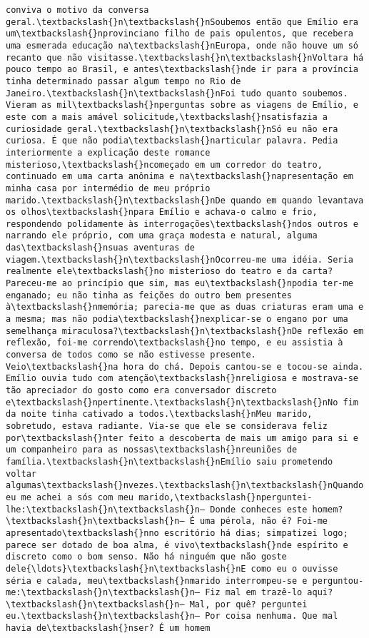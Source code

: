 \documentclass[11pt]{article}
\begin{document}
\begin{Verbatim}[commandchars=\\\{\}]
conviva o motivo da conversa geral.\textbackslash{}n\textbackslash{}nSoubemos então que Emílio era um\textbackslash{}nprovinciano filho de pais opulentos, que recebera uma esmerada educação na\textbackslash{}nEuropa, onde não houve um só recanto que não visitasse.\textbackslash{}n\textbackslash{}nVoltara há pouco tempo ao Brasil, e antes\textbackslash{}nde ir para a província tinha determinado passar algum tempo no Rio de Janeiro.\textbackslash{}n\textbackslash{}nFoi tudo quanto soubemos. Vieram as mil\textbackslash{}nperguntas sobre as viagens de Emílio, e este com a mais amável solicitude,\textbackslash{}nsatisfazia a curiosidade geral.\textbackslash{}n\textbackslash{}nSó eu não era curiosa. É que não podia\textbackslash{}narticular palavra. Pedia interiormente a explicação deste romance misterioso,\textbackslash{}ncomeçado em um corredor do teatro, continuado em uma carta anônima e na\textbackslash{}napresentação em minha casa por intermédio de meu próprio marido.\textbackslash{}n\textbackslash{}nDe quando em quando levantava os olhos\textbackslash{}npara Emílio e achava-o calmo e frio, respondendo polidamente às interrogações\textbackslash{}ndos outros e narrando ele próprio, com uma graça modesta e natural, alguma das\textbackslash{}nsuas aventuras de viagem.\textbackslash{}n\textbackslash{}nOcorreu-me uma idéia. Seria realmente ele\textbackslash{}no misterioso do teatro e da carta? Pareceu-me ao princípio que sim, mas eu\textbackslash{}npodia ter-me enganado; eu não tinha as feições do outro bem presentes à\textbackslash{}nmemória; parecia-me que as duas criaturas eram uma e a mesma; mas não podia\textbackslash{}nexplicar-se o engano por uma semelhança miraculosa?\textbackslash{}n\textbackslash{}nDe reflexão em reflexão, foi-me correndo\textbackslash{}no tempo, e eu assistia à conversa de todos como se não estivesse presente. Veio\textbackslash{}na hora do chá. Depois cantou-se e tocou-se ainda. Emílio ouvia tudo com atenção\textbackslash{}nreligiosa e mostrava-se tão apreciador do gosto como era conversador discreto e\textbackslash{}npertinente.\textbackslash{}n\textbackslash{}nNo fim da noite tinha cativado a todos.\textbackslash{}nMeu marido, sobretudo, estava radiante. Via-se que ele se considerava feliz por\textbackslash{}nter feito a descoberta de mais um amigo para si e um companheiro para as nossas\textbackslash{}nreuniões de família.\textbackslash{}n\textbackslash{}nEmílio saiu prometendo voltar algumas\textbackslash{}nvezes.\textbackslash{}n\textbackslash{}nQuando eu me achei a sós com meu marido,\textbackslash{}nperguntei-lhe:\textbackslash{}n\textbackslash{}n— Donde conheces este homem?\textbackslash{}n\textbackslash{}n— É uma pérola, não é? Foi-me apresentado\textbackslash{}nno escritório há dias; simpatizei logo; parece ser dotado de boa alma, é vivo\textbackslash{}nde espírito e discreto como o bom senso. Não há ninguém que não goste dele{\ldots}\textbackslash{}n\textbackslash{}nE como eu o ouvisse séria e calada, meu\textbackslash{}nmarido interrompeu-se e perguntou-me:\textbackslash{}n\textbackslash{}n— Fiz mal em trazê-lo aqui?\textbackslash{}n\textbackslash{}n— Mal, por quê? perguntei eu.\textbackslash{}n\textbackslash{}n— Por coisa nenhuma. Que mal havia de\textbackslash{}nser? É um homem 
\end{Verbatim}
\end{document}

